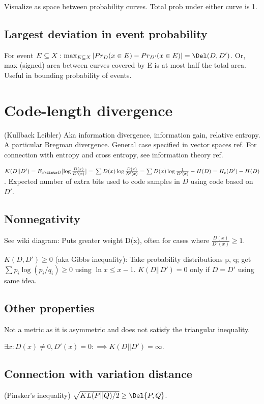 \documentclass[oneside, article]{memoir}
\begin{document}
Visualize as space between probability curves. Total prob under either curve is 1.

\subsection{Largest deviation in event probability}
For event $E \subseteq X: \max_{E \subseteq X} |Pr_{D}(x \in E) - Pr_{D'}(x \in E)| = \Del(D, D')$. Or, max (signed) area between curves covered by E is at most half the total area. Useful in bounding probability of events.

\section{Code-length divergence}
(Kullback Leibler) Aka information divergence, information gain, relative entropy. A particular Bregman divergence. General case specified in vector spaces ref. For connection with entropy and cross entropy, see information theory ref.

$K(D||D') = E_{x \distr D}[\log \frac{D(x)}{D'(x)}] = \\
\sum D(x) \log \frac{D(x)}{D'(x)} = \sum D(x) \log \frac{1}{D'(x)} - H(D) = H_c(D') - H(D)$. Expected number of extra bits used to code samples in $D$ using code based on $D'$.

\subsection{Nonnegativity}
See wiki diagram: Puts greater weight D(x), often for cases where $\frac{D(x)}{D'(x)} \geq 1$.

$K(D, D') \geq 0$ (aka Gibbs inequality): Take probability distributions p, q; get $\sum p_i \log (p_i/ q_i) \geq 0$ using $\ln x \leq x - 1$.
$K(D||D') = 0$ only if $D = D'$ using same idea.

\subsection{Other properties}
Not a metric as it is asymmetric and does not satisfy the triangular inequality.

$\exists x: D(x) \neq 0, D'(x) =0: \implies K(D||D') = \infty$.

\subsection{Connection with variation distance}
(Pinsker's inequality) $\sqrt{KL(P||Q)/2} \geq \Del{P, Q}$.\why
\end{document}
